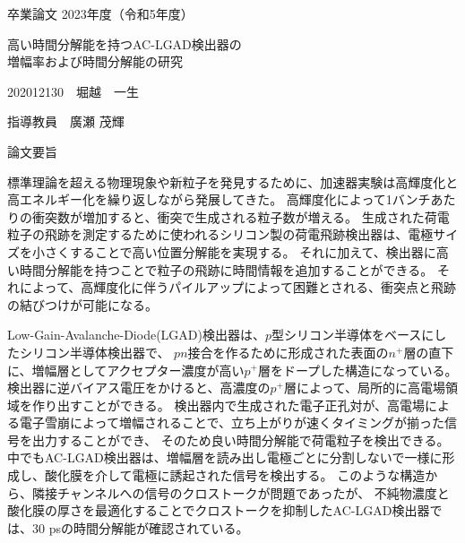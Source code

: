 \begin{center}
  {\Large 卒業論文 2023年度（令和5年度）}

  {\LARGE 高い時間分解能を持つAC-LGAD検出器の\\増幅率および時間分解能の研究}
\end{center}

\quad

\begin{flushright}
    202012130　堀越　一生

    指導教員　廣瀬 茂輝
\end{flushright}

\quad

{\large \gt 論文要旨}

  標準理論を超える物理現象や新粒子を発見するために、加速器実験は高輝度化と高エネルギー化を繰り返しながら発展してきた。
  高輝度化によって1バンチあたりの衝突数が増加すると、衝突で生成される粒子数が増える。
  生成された荷電粒子の飛跡を測定するために使われるシリコン製の荷電飛跡検出器は、電極サイズを小さくすることで高い位置分解能を実現する。
  それに加えて、検出器に高い時間分解能を持つことで粒子の飛跡に時間情報を追加することができる。
  それによって、高輝度化に伴うパイルアップによって困難とされる、衝突点と飛跡の結びつけが可能になる。
  
  Low-Gain-Avalanche-Diode(LGAD)検出器は、$p$型シリコン半導体をベースにしたシリコン半導体検出器で、
  $pn$接合を作るために形成された表面の$n^+$層の直下に、増幅層としてアクセプター濃度が高い$p^+$層をドープした構造になっている。
  検出器に逆バイアス電圧をかけると、高濃度の$p^+$層によって、局所的に高電場領域を作り出すことができる。
  検出器内で生成された電子正孔対が、高電場による電子雪崩によって増幅されることで、立ち上がりが速くタイミングが揃った信号を出力することができ、
  そのため良い時間分解能で荷電粒子を検出できる。
  中でもAC-LGAD検出器は、増幅層を読み出し電極ごとに分割しないで一様に形成し、酸化膜を介して電極に誘起された信号を検出する。
  このような構造から、隣接チャンネルへの信号のクロストークが問題であったが、
  不純物濃度と酸化膜の厚さを最適化することでクロストークを抑制したAC-LGAD検出器では、30 psの時間分解能が確認されている。
  
  
